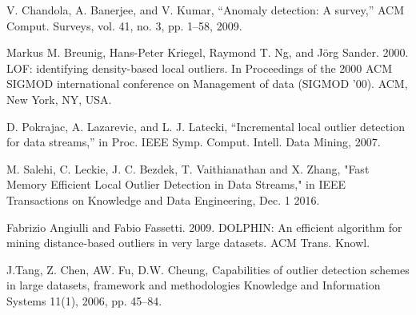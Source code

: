 \begin{thebibliography}{9}
	
	V. Chandola, A. Banerjee, and V. Kumar, “Anomaly detection: A
	survey,” ACM Comput. Surveys, vol. 41, no. 3, pp. 1–58, 2009.
	
	Markus M. Breunig, Hans-Peter Kriegel, Raymond T. Ng, and Jörg Sander. 2000. LOF: identifying density-based local outliers. In Proceedings of the 2000 ACM SIGMOD international conference on Management of data (SIGMOD '00). ACM, New York, NY, USA. 
	
	D. Pokrajac, A. Lazarevic, and L. J. Latecki, “Incremental local outlier
	detection for data streams,” in Proc. IEEE Symp. Comput. Intell.
	Data Mining, 2007.
	
	M. Salehi, C. Leckie, J. C. Bezdek, T. Vaithianathan and X. Zhang, "Fast Memory Efficient Local Outlier Detection in Data Streams," in IEEE Transactions on Knowledge and Data Engineering, Dec. 1 2016.
	
	Fabrizio Angiulli and Fabio Fassetti. 2009. DOLPHIN: An efficient algorithm for mining distance-based outliers in very large datasets. ACM Trans. Knowl.
	
	J.Tang, Z. Chen, AW. Fu, D.W. Cheung, Capabilities of outlier detection schemes in large datasets, framework and methodologies Knowledge and Information Systems 11(1), 2006, pp. 45–84.
	
	
\end{thebibliography}

